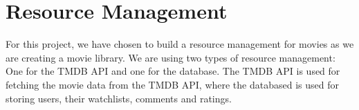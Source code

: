 \section{Resource Management}
 

For this project, we have chosen to build a resource management for movies as we are creating a movie library.
We are using two types of resource management: One for the TMDB API and one for the database.
The TMDB API is used for fetching the movie data from the TMDB API, where the databased is used for storing users, their watchlists, comments and ratings.

